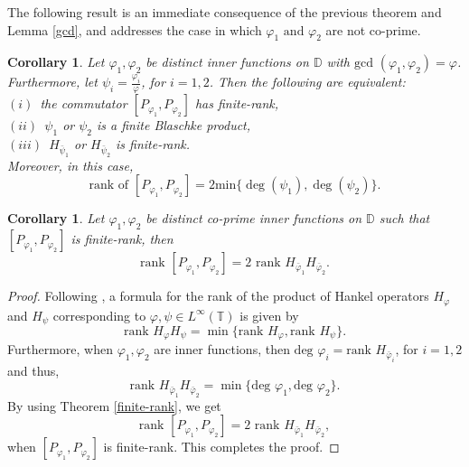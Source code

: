 \documentclass[12pt, a4 paper]{amsart}
\newcommand{\cll}{\mathcal{L}}
\newcommand{\D}{\mathbb{D}}
\newcommand{\T}{\mathbb{T}}
\theoremstyle{definition}
\theoremstyle{plain}
\newtheorem{cor}[thm]{Corollary}
\theoremstyle{definition}
\numberwithin{equation}{section}
\let\phi=\varphi
\begin{document}
The following result is an immediate consequence of the previous theorem and Lemma \ref{gcd}, and addresses the case in which $\phi_1\text{ and }\phi_2$ are not co-prime.
 \begin{cor}\label{without gcd1}
Let $\phi_1, \phi_2$ be distinct inner functions on $\D$ with $\mbox{gcd }(\phi_1, \phi_2) = \phi$. Furthermore, let $\psi_i = \tfrac{\phi_i}{\phi}$, for $i=1,2$. Then the following are equivalent:\\ \vspace{1mm}
$(i)$~the commutator $[P_{\phi_1}, P_{\phi_2}]$ has  finite-rank,\\ \vspace{1mm}
$(ii)$~$\psi_1$ or $\psi_2$ is a finite Blaschke product,\\
$(iii)$~$H_{\bar \psi_1}$ or $H_{\bar \psi_2}$ is finite-rank.\\ \vspace{1mm} \vspace{1mm}
Moreover, in this case, 
\[
\text{rank of } [P_{\phi_1}, P_{\phi_2}] = 2 \text{min}\{\deg (\psi_1), \deg (\psi_2)\}.\]
 \end{cor}
\begin{cor}
Let $\phi_1, \phi_2$ be distinct co-prime inner functions on $\D$ such that $[P_{\phi_1}, P_{\phi_2}]$ is finite-rank, then $$\mbox{rank }[P_{\phi_1}, P_{\phi_2}] = 2 \mbox{ rank } H_{\bar \phi_1} H_{\bar \phi_2}.$$
\end{cor}
\begin{proof}
Following \cite[Theorem 2]{Richman}, a formula for the rank of the product of Hankel operators $H_{\phi}$ and $H_{\psi}$ corresponding to $\phi, \psi \in L^{\infty}(\T)$ is given by
\[
\mbox{rank } H_{\phi} H_{\psi} = \min \{\mbox{rank } H_{\phi}, \mbox{rank } H_{\psi}\}.
\]
Furthermore, when $\phi_1, \phi_2$ are inner functions, then $\mbox{deg }\phi_i = \mbox{rank }H_{\bar \phi_i}$, for $i=1,2$ and thus,
\[
\mbox{rank } H_{\bar \phi_1} H_{\bar \phi_2} = \min \{\mbox{deg }\phi_1, \mbox{deg }\phi_2\}.
\]
By using Theorem \ref{finite-rank},  we get $$\mbox{rank }[P_{\phi_1}, P_{\phi_2}] = 2 \mbox{ rank } H_{\bar \phi_1} H_{\bar \phi_2},$$
when $[P_{\phi_1}, P_{\phi_2}]$ is finite-rank. This completes the proof.
\end{proof}
\end{document}
